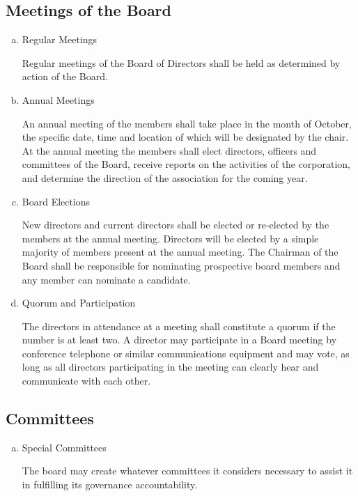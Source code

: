 \subsection{Meetings of the Board}
\begin{enumerate}[(a)]
\item Regular Meetings

Regular meetings of the Board of Directors shall be held as determined by action of the Board.

\item Annual Meetings

An annual meeting of the members shall take place in the month of October, the specific date, time and location of which will be designated by the chair. At the annual meeting the members shall elect directors, officers and committees of the Board, receive reports on the activities of the corporation, and determine the direction of the association for the coming year.

\item Board Elections

New directors and current directors shall be elected or re-elected by the members at the annual meeting. Directors will be elected by a simple majority of members present at the annual meeting. The Chairman of the Board shall be responsible for nominating prospective board members and any member can nominate a candidate. 

\item Quorum and Participation

The directors in attendance at a meeting shall constitute a quorum if the number is at least two. A director may participate in a Board meeting by conference telephone or similar communications equipment and may vote, as long as all directors participating in the meeting can clearly hear and communicate with each other.

\end{enumerate}

\subsection{Committees}
\begin{enumerate}[(a)]
\item Special Committees

The board may create whatever committees it considers necessary to assist it in fulfilling its governance accountability.

\end{enumerate}
    
    
    
    
    
    